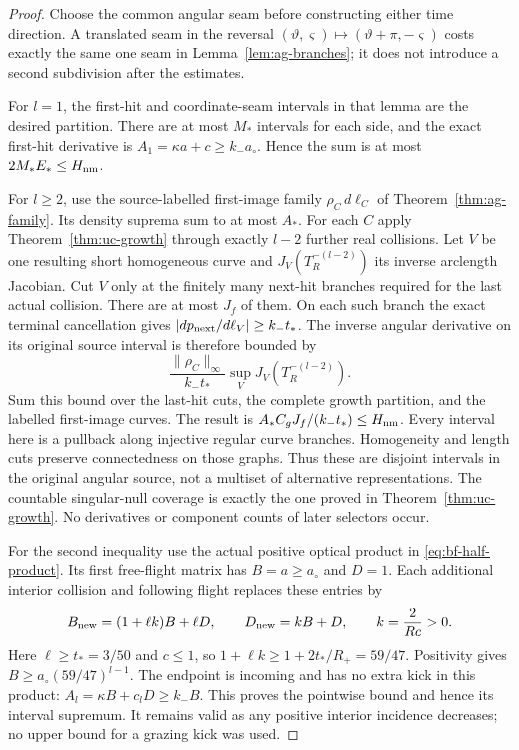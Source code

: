 \begin{proof}
Choose the common angular seam before constructing either time
direction.  A translated seam in the reversal
$(\vartheta,\varsigma)\mapsto(\vartheta+\pi,-\varsigma)$ costs
exactly the same one seam in Lemma~\ref{lem:ag-branches}; it does
not introduce a second subdivision after the estimates.

For $l=1$, the first-hit and coordinate-seam intervals in that
lemma are the desired partition.  There are at most $M_*$
intervals for each side, and the exact first-hit derivative is
$A_1=\kappa a+c\ge k_-a_\circ$.  Hence the sum is at most
$2M_*E_*\le H_{\rm nm}$.

For $l\ge2$, use the source-labelled first-image family
$\rho_C\,d\ell_C$ of Theorem~\ref{thm:ag-family}.
Its density suprema sum to at most $A_*$.  For each $C$ apply
Theorem~\ref{thm:uc-growth} through exactly $l-2$ further real
collisions.  Let $V$ be one resulting short homogeneous curve and
$J_V(T_R^{-(l-2)})$ its inverse arclength Jacobian.  Cut $V$
only at the finitely many next-hit branches required for the last
actual collision.  There are at most $J_f$ of them.  On each such
branch the exact terminal cancellation gives
$|dp_{\rm next}/d\ell_V|\ge k_-t_*$.
The inverse angular derivative on its original source interval is
therefore bounded by
\[
 \frac{\|\rho_C\|_\infty}{k_-t_*}
                   \sup_V J_V(T_R^{-(l-2)}).
\]
Sum this bound over the last-hit cuts, the complete growth partition,
and the labelled first-image curves.  The result is
$A_*C_gJ_f/(k_-t_*)\le H_{\rm nm}$.
Every interval here is a pullback along injective regular curve
branches.  Homogeneity and length cuts preserve connectedness on
those graphs.  Thus these are disjoint intervals in the original
angular source, not a multiset of alternative representations.
The countable singular-null coverage is exactly the one proved
in Theorem~\ref{thm:uc-growth}.  No derivatives or component counts
of later selectors occur.

For the second inequality use the actual positive optical product
in \eqref{eq:bf-half-product}.  Its first free-flight matrix has
$B=a\ge a_\circ$ and $D=1$.  Each additional interior collision
and following flight replaces these entries by
\[
 B_{\rm new}=(1+\ell k)B+\ell D,\qquad
 D_{\rm new}=kB+D,\qquad
 k=\frac{2}{Rc}>0.
\]
Here $\ell\ge t_*=3/50$ and $c\le1$, so
$1+\ell k\ge1+2t_*/R_+=59/47$.  Positivity gives
$B\ge a_\circ(59/47)^{l-1}$.
The endpoint is incoming and has no extra kick in this product:
$A_l=\kappa B+c_lD\ge k_-B$.
This proves the pointwise bound and hence its interval supremum.
It remains valid as any positive interior incidence decreases;
no upper bound for a grazing kick was used.


\end{proof}
